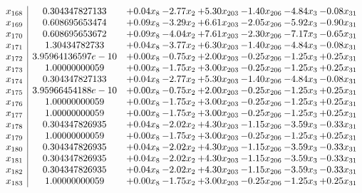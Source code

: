 \documentclass[8pt]{article}
\begin{document}
\[\begin{array}{c| c c@{\hskip 2pt} c@{\hskip 2pt} c@{\hskip 2pt} c@{\hskip 2pt} c@{\hskip 2pt} c@{\hskip 2pt} }
 x_{168}   &  0.304347827133 & +  0.04 x_{8} & -2.77 x_{2} & +  5.30 x_{203} & -1.40 x_{206} & -4.84 x_{3} & -0.08 x_{31}\\
 x_{169}   &  0.608695653474 & +  0.09 x_{8} & -3.29 x_{2} & +  6.61 x_{203} & -2.05 x_{206} & -5.92 x_{3} & -0.90 x_{31}\\
 x_{170}   &  0.608695653672 & +  0.09 x_{8} & -4.04 x_{2} & +  7.61 x_{203} & -2.30 x_{206} & -7.17 x_{3} & -0.65 x_{31}\\
 x_{171}   &  1.30434782733 & +  0.04 x_{8} & -3.77 x_{2} & +  6.30 x_{203} & -1.40 x_{206} & -4.84 x_{3} & -0.08 x_{31}\\
 x_{172}   &  3.95964136597e-10 & +  0.00 x_{8} & -0.75 x_{2} & +  2.00 x_{203} & -0.25 x_{206} & -1.25 x_{3} & +  0.25 x_{31}\\
 x_{173}   &  1.00000000059 & +  0.00 x_{8} & -1.75 x_{2} & +  3.00 x_{203} & -0.25 x_{206} & -1.25 x_{3} & +  0.25 x_{31}\\
 x_{174}   &  0.304347827133 & +  0.04 x_{8} & -2.77 x_{2} & +  5.30 x_{203} & -1.40 x_{206} & -4.84 x_{3} & -0.08 x_{31}\\
 x_{175}   &  3.95966454188e-10 & +  0.00 x_{8} & -0.75 x_{2} & +  2.00 x_{203} & -0.25 x_{206} & -1.25 x_{3} & +  0.25 x_{31}\\
 x_{176}   &  1.00000000059 & +  0.00 x_{8} & -1.75 x_{2} & +  3.00 x_{203} & -0.25 x_{206} & -1.25 x_{3} & +  0.25 x_{31}\\
 x_{177}   &  1.00000000059 & +  0.00 x_{8} & -1.75 x_{2} & +  3.00 x_{203} & -0.25 x_{206} & -1.25 x_{3} & +  0.25 x_{31}\\
 x_{178}   &  0.304347826935 & +  0.04 x_{8} & -2.02 x_{2} & +  4.30 x_{203} & -1.15 x_{206} & -3.59 x_{3} & -0.33 x_{31}\\
 x_{179}   &  1.00000000059 & +  0.00 x_{8} & -1.75 x_{2} & +  3.00 x_{203} & -0.25 x_{206} & -1.25 x_{3} & +  0.25 x_{31}\\
 x_{180}   &  0.304347826935 & +  0.04 x_{8} & -2.02 x_{2} & +  4.30 x_{203} & -1.15 x_{206} & -3.59 x_{3} & -0.33 x_{31}\\
 x_{181}   &  0.304347826935 & +  0.04 x_{8} & -2.02 x_{2} & +  4.30 x_{203} & -1.15 x_{206} & -3.59 x_{3} & -0.33 x_{31}\\
 x_{182}   &  0.304347826935 & +  0.04 x_{8} & -2.02 x_{2} & +  4.30 x_{203} & -1.15 x_{206} & -3.59 x_{3} & -0.33 x_{31}\\
 x_{183}   &  1.00000000059 & +  0.00 x_{8} & -1.75 x_{2} & +  3.00 x_{203} & -0.25 x_{206} & -1.25 x_{3} & +  0.25 x_{31}\\

\end{array}\]
\end{document}
